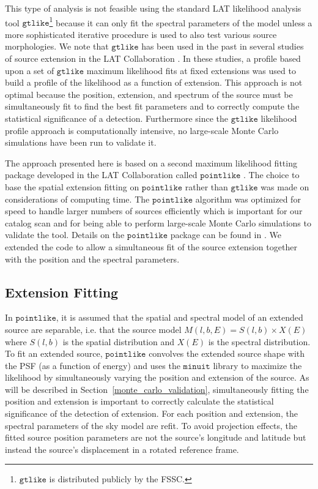 \documentclass[12pt,preprint]{aastex}
\newcommand{\gtlike}{\ensuremath{\mathtt{gtlike}}\xspace}
\newcommand{\pointlike}{\ensuremath{\mathtt{pointlike}}\xspace}
\newcommand{\minuit}{\ensuremath{\mathtt{minuit}}\xspace}
\begin{document}
This type of analysis is not feasible using the standard LAT likelihood
analysis tool \gtlike\footnote{\gtlike is distributed publicly by the
FSSC.} because it can only fit the spectral parameters of the model
unless a more sophisticated iterative procedure is used to also test
various source morphologies.  We note that \gtlike has been used in the
past in several studies of source extension in the LAT Collaboration
\citep{lmc,smc,w28,w51c}.  In these studies, a profile based upon a
set of \gtlike maximum likelihood fits at fixed extensions was used
to build a profile of the likelihood as a function of extension.
This approach is not optimal because the position, extension, and
spectrum of the source must be simultaneously fit to find the best fit
parameters and to correctly compute the statistical significance of
a detection.  Furthermore since the \gtlike likelihood profile approach
is computationally intensive, no large-scale Monte Carlo simulations
have been run to validate it.

The approach presented here is based on a second maximum likelihood
fitting package developed in the LAT Collaboration called \pointlike
\citep{first_cat,matthew_kerr_thesis}.  The choice to base the
spatial extension fitting on \pointlike rather than \gtlike was made
on considerations of computing time.  The \pointlike algorithm was
optimized for speed to handle larger numbers of sources efficiently
which is important for our catalog scan and for being able
to perform large-scale Monte Carlo simulations to validate the tool.
Details on the \pointlike package can be
found in \cite{matthew_kerr_thesis}.  We extended the code to allow a
simultaneous fit of the source extension together with the position and
the spectral parameters.

\subsection{Extension Fitting}
\label{extension_fitting}

In \pointlike, it is assumed that the spatial and spectral
model of an extended source are separable, i.e. that the source
model $M(l,b,E)=S(l,b)\times X(E)$ where $S(l,b)$ is the spatial
distribution and $X(E)$ is the spectral distribution.  To fit an extended source,
\pointlike convolves the extended source shape with the PSF (as a
function of energy) and uses the \minuit library 
\citep{minuit_documentation}
to maximize the
likelihood by simultaneously varying the position and extension of
the source.  As will be described in
Section~\ref{monte_carlo_validation}, simultaneously fitting the position
and extension is important to correctly calculate the statistical
significance of the detection of extension.  For each position and
extension, the spectral parameters of the sky model are refit.  To avoid
projection effects, the fitted source position parameters are not the
source's longitude and latitude but instead the source's displacement
in a rotated reference frame.
\end{document}
